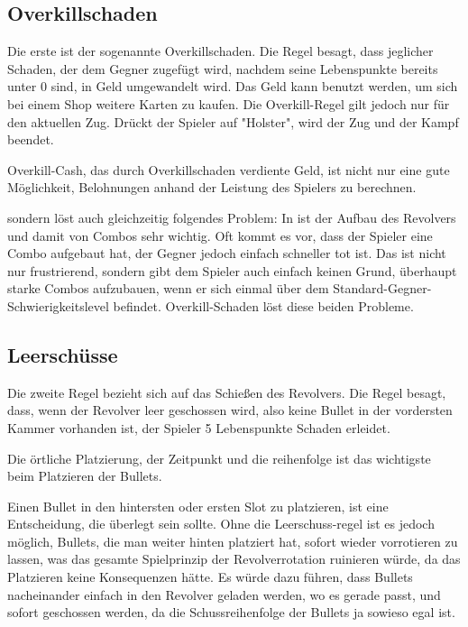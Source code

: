 \subsection{Overkillschaden}\label{Overkill}

Die erste ist der sogenannte Overkillschaden.
Die Regel besagt, dass jeglicher Schaden, der dem Gegner zugefügt wird, nachdem seine Lebenspunkte bereits unter 0 sind,
in Geld umgewandelt wird. Das Geld kann benutzt werden, um sich bei einem Shop weitere Karten zu kaufen.
Die Overkill-Regel gilt jedoch nur für den aktuellen Zug. Drückt der Spieler auf "Holster", wird der Zug und der Kampf beendet.


Overkill-Cash, das durch Overkillschaden verdiente Geld, ist nicht nur eine gute Möglichkeit, Belohnungen anhand der Leistung des Spielers zu berechnen.


sondern löst auch gleichzeitig folgendes Problem: In \FF ist der Aufbau des Revolvers und damit von Combos sehr wichtig.
Oft kommt es vor, dass der Spieler eine Combo aufgebaut hat, der Gegner jedoch einfach schneller tot ist.
Das ist nicht nur frustrierend, sondern gibt dem Spieler auch einfach keinen Grund, überhaupt starke Combos aufzubauen,
wenn er sich einmal über dem Standard-Gegner-Schwierigkeitslevel befindet. Overkill-Schaden löst diese beiden Probleme.


\subsection{Leerschüsse}\label{leerschüsse}

Die zweite Regel bezieht sich auf das Schießen des Revolvers.
Die Regel besagt, dass, wenn der Revolver leer geschossen wird, also keine Bullet in der vordersten Kammer vorhanden ist,
der Spieler 5 Lebenspunkte Schaden erleidet.

Die örtliche Platzierung, der Zeitpunkt und die reihenfolge ist das wichtigste beim Platzieren der Bullets.

Einen Bullet in den hintersten oder ersten Slot zu platzieren, ist eine Entscheidung, die überlegt sein sollte.
Ohne die Leerschuss-regel ist es jedoch möglich, Bullets, die man weiter hinten platziert hat, sofort wieder vorrotieren zu lassen,
was das gesamte Spielprinzip der Revolverrotation ruinieren würde, da das Platzieren keine Konsequenzen hätte.
Es würde dazu führen, dass Bullets nacheinander einfach in den Revolver geladen werden, wo es gerade passt, und sofort
geschossen werden, da die Schussreihenfolge der Bullets ja sowieso egal ist.


